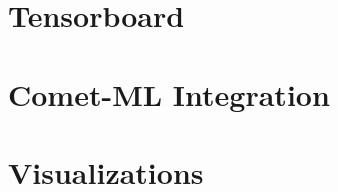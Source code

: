 \documentclass[../../fyp.tex]{subfiles}
\begin{document}
\section{Tensorboard}


\section{Comet-ML Integration}


\section{Visualizations}



\end{document}
